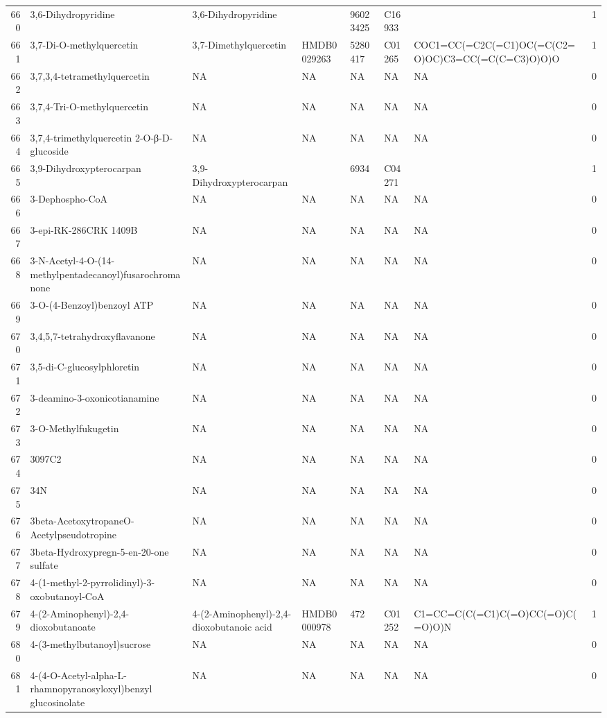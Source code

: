 \documentclass[a4paper]{article}
\begin{document}
\begin{longtable}{rlllllll}
  660 & 3,6-Dihydropyridine & 3,6-Dihydropyridine &  & 96023425 & C16933 &  & 1 \\ 
  661 & 3,7-Di-O-methylquercetin & 3,7-Dimethylquercetin & HMDB0029263 & 5280417 & C01265 & COC1=CC(=C2C(=C1)OC(=C(C2=O)OC)C3=CC(=C(C=C3)O)O)O & 1 \\ 
  662 & 3,7,3,4-tetramethylquercetin & NA & NA & NA & NA & NA & 0 \\ 
  663 & 3,7,4-Tri-O-methylquercetin & NA & NA & NA & NA & NA & 0 \\ 
  664 & 3,7,4-trimethylquercetin 2-O-β-D-glucoside & NA & NA & NA & NA & NA & 0 \\ 
  665 & 3,9-Dihydroxypterocarpan & 3,9-Dihydroxypterocarpan &  & 6934 & C04271 &  & 1 \\ 
  666 & 3-Dephospho-CoA & NA & NA & NA & NA & NA & 0 \\ 
  667 & 3-epi-RK-286CRK 1409B & NA & NA & NA & NA & NA & 0 \\ 
  668 & 3-N-Acetyl-4-O-(14-methylpentadecanoyl)fusarochromanone & NA & NA & NA & NA & NA & 0 \\ 
  669 & 3-O-(4-Benzoyl)benzoyl ATP & NA & NA & NA & NA & NA & 0 \\ 
  670 & 3,4,5,7-tetrahydroxyflavanone & NA & NA & NA & NA & NA & 0 \\ 
  671 & 3,5-di-C-glucosylphloretin & NA & NA & NA & NA & NA & 0 \\ 
  672 & 3-deamino-3-oxonicotianamine & NA & NA & NA & NA & NA & 0 \\ 
  673 & 3-O-Methylfukugetin & NA & NA & NA & NA & NA & 0 \\ 
  674 & 3097C2 & NA & NA & NA & NA & NA & 0 \\ 
  675 & 34N & NA & NA & NA & NA & NA & 0 \\ 
  676 & 3beta-AcetoxytropaneO-Acetylpseudotropine & NA & NA & NA & NA & NA & 0 \\ 
  677 & 3beta-Hydroxypregn-5-en-20-one sulfate & NA & NA & NA & NA & NA & 0 \\ 
  678 & 4-(1-methyl-2-pyrrolidinyl)-3-oxobutanoyl-CoA & NA & NA & NA & NA & NA & 0 \\ 
  679 & 4-(2-Aminophenyl)-2,4-dioxobutanoate & 4-(2-Aminophenyl)-2,4-dioxobutanoic acid & HMDB0000978 & 472 & C01252 & C1=CC=C(C(=C1)C(=O)CC(=O)C(=O)O)N & 1 \\ 
  680 & 4-(3-methylbutanoyl)sucrose & NA & NA & NA & NA & NA & 0 \\ 
  681 & 4-(4-O-Acetyl-alpha-L-rhamnopyranosyloxyl)benzyl glucosinolate & NA & NA & NA & NA & NA & 0 \\ 

\end{longtable}
\end{document}

